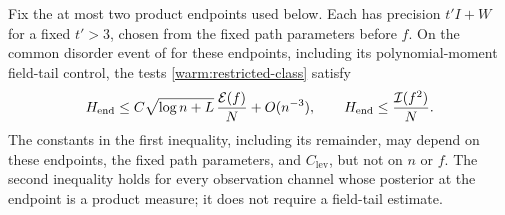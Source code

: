 \begin{lemma}\label{warm:product}
Fix the at most two product endpoints used below.  Each has precision
\(t'I+W\) for a fixed \(t'>3\), chosen from the fixed path parameters
before \(f\).  On the common disorder event of
\cite[Equation~(19.10)]{CM} for these endpoints, including its
polynomial-moment field-tail control, the tests
\eqref{warm:restricted-class} satisfy
\begin{equation}
 H_{\rm end}\le
 C\sqrt{\log n+L}\,\frac{\mathcal E(f)}N+O(n^{-3}),
 \qquad
 H_{\rm end}\le\frac{\mathcal I(f^2)}N .                         \label{warm:product-bounds}
\end{equation}
The constants in the first inequality, including its remainder, may
depend on these endpoints, the fixed path parameters, and
\(C_{\mathrm{lev}}\), but not on \(n\) or \(f\).
The second inequality holds for every observation channel whose
posterior at the endpoint is a product measure; it does not require
a field-tail estimate.
\end{lemma}

